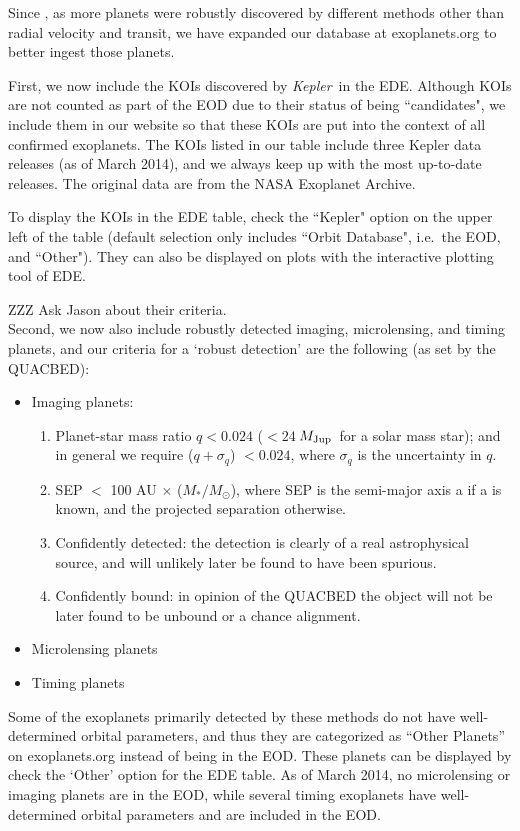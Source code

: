 \documentclass[11pt,preprint]{aastex}
\def\kepler{\textit{Kepler}}
\def\mjup{$M_{\rm Jup}$}
\begin{document}
\begin{CJK*}{UTF8}{gbsn}
Since \cite{Wright2011}, as more planets were robustly discovered by
different methods other than radial velocity and transit, we have
expanded our database at exoplanets.org to better ingest those
planets.

First, we now include the KOIs discovered by \kepler\ in the
EDE. Although KOIs are not counted as part of the EOD due to their
status of being ``candidates", we include them in our website so that
these KOIs are put into the context of all confirmed exoplanets. The
KOIs listed in our table include three Kepler data releases (as of
March 2014), and we always keep up with the most up-to-date
releases. The original data are from the NASA Exoplanet Archive.

To display the KOIs in the EDE table, check the ``Kepler" option on the
upper left of the table (default selection only includes ``Orbit
Database", i.e.~the EOD, and ``Other"). They can also be displayed on
plots with the interactive plotting tool of EDE.

ZZZ Ask Jason about their criteria. \\ Second, we now also include
robustly detected imaging, microlensing, and timing planets, and our
criteria for a `robust detection' are the following (as set by the
QUACBED):

\begin{itemize}
\item Imaging planets:
\begin{enumerate}
\item Planet-star mass ratio $q < 0.024$ ($< 24\ $\mjup\ for a solar
  mass star); and in general we require ($q+\sigma_q$) $< 0.024$,
  where $\sigma_q$ is the uncertainty in $q$.
\item SEP $<$ 100 AU $\times$ ($M_*/M_\odot$), where SEP is the
  semi-major axis a if a is known, and the projected separation
  otherwise.
\item Confidently detected: the detection is clearly of a real
  astrophysical source, and will unlikely later be found to have been
  spurious.
\item Confidently bound: in opinion of the QUACBED the object will not
  be later found to be unbound or a chance alignment.

\end{enumerate}
\item Microlensing planets

\item Timing planets

\end{itemize}
Some of the exoplanets primarily detected by these methods do not have
well-determined orbital parameters, and thus they are categorized as
``Other Planets'' on exoplanets.org instead of being in the EOD. These
planets can be displayed by check the `Other' option for the EDE
table. As of March 2014, no microlensing or imaging planets are in the
EOD, while several timing exoplanets have well-determined orbital
parameters and are included in the EOD.


\end{CJK*}
\end{document}
